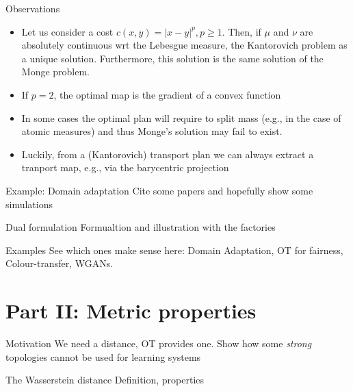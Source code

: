 \documentclass[pdf,aspectratio=169,10pt]{beamer}
\begin{document}
\begin{frame}{Observations}
    \begin{itemize}
        \item Let us consider a cost $c(x,y) = |x-y|^p, p\geq 1$. Then, if $\mu$ and $\nu$ are absolutely continuous wrt the Lebesgue measure, the Kantorovich problem as a unique solution. Furthermore, this solution is the same solution of the Monge problem.
        \item If $p=2$, the optimal map is the gradient of a convex function
        \item In some cases the optimal plan will require to split mass (e.g., in the case of atomic measures) and thus Monge's solution may fail to exist. 
        \item Luckily, from a (Kantorovich) transport plan we can always extract a tranport map, e.g., via the barycentric projection
    \end{itemize}
\end{frame}





\begin{frame}{Example: Domain adaptation}
    Cite some papers and hopefully show some simulations
\end{frame}


\begin{frame}{Dual formulation}
    Formualtion and illustration with the factories
\end{frame}

\begin{frame}{Examples}
    See which ones make sense here:  Domain Adaptation,  OT for fairness,  Colour-transfer, WGANs.
\end{frame}


\section{Part II: Metric properties}



\begin{frame}{Motivation}
    We need a distance, OT provides one. Show how some \emph{strong} topologies cannot be used for learning systems
\end{frame}

\begin{frame}{The Wasserstein distance}
    Definition, properties
\end{frame}
\end{document}
